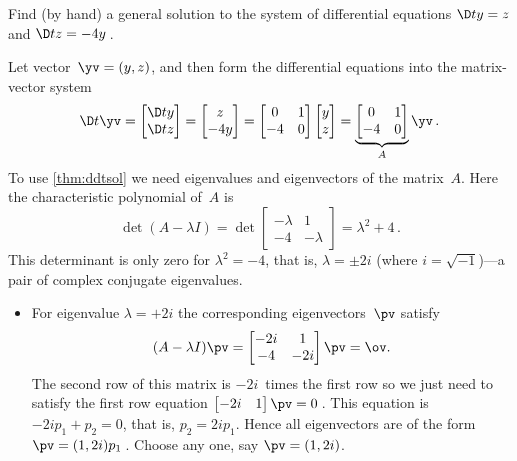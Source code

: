 \begin{example} \label{eg:decis2t} 
Find (by hand) a general solution to the system of differential equations
\(\D ty=z\) and \(\D tz=-4y\)\,.
\begin{solution} 
Let vector~\(\yv=(y,z)\), and then form the differential equations into the matrix-vector system
\begin{equation*}
\D t\yv=\begin{bmatrix} \D ty\\\D tz \end{bmatrix}
=\begin{bmatrix} z\\-4y \end{bmatrix}
=\begin{bmatrix} 0&1\\-4&0 \end{bmatrix}
\begin{bmatrix} y\\z \end{bmatrix}
=\underbrace{\begin{bmatrix} 0&1\\-4&0 \end{bmatrix}}_A\yv\,.
\end{equation*}
To use \autoref{thm:ddtsol} we need eigenvalues and eigenvectors of the matrix~\(A\).
Here the characteristic polynomial of~\(A\) is
\begin{equation*}
\det(A-\lambda I)=\det\begin{bmatrix} -\lambda&1\\-4&-\lambda \end{bmatrix}
=\lambda^2+4\,.
\end{equation*}
This determinant is only zero for \(\lambda^2=-4\), that is, \(\lambda=\pm2i\) (where \(i=\sqrt{-1}\))---a pair of complex conjugate eigenvalues.
\begin{itemize}
\item For eigenvalue \(\lambda=+2i\) the corresponding eigenvectors~\(\pv\) satisfy
\begin{equation*}
(A-\lambda I)\pv=\begin{bmatrix} -2i&1\\-4&-2i \end{bmatrix}\pv
=\ov.
\end{equation*}
The second row of this matrix is \(-2i\)~times the first row so we just need to satisfy the first row equation \(\begin{bmatrix} -2i&1 \end{bmatrix}\pv=0\)\,.
This equation is \(-2ip_1+p_2=0\), that is, \(p_2=2ip_1\).
Hence all eigenvectors are of the form \(\pv=(1,2i)p_1\)\,.
Choose any one, say \(\pv=(1,2i)\).


\end{itemize}
\end{solution}
\end{example}
